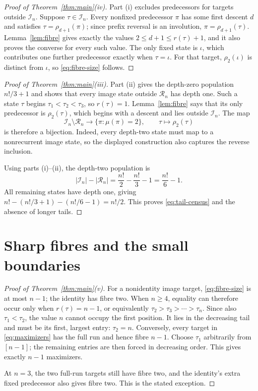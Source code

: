 \documentclass[a4paper,10pt]{amsart}
\theoremstyle{remark}
\newcommand{\cI}{\mathcal I}
\newcommand{\cR}{\mathcal R}
\begin{document}
\begin{proof}[Proof of Theorem~\ref{thm:main}(iv)]
Part (i) excludes predecessors for targets outside $\cI_n$.  Suppose
$\tau\in\cI_n$.  Every nonfixed predecessor $\pi$ has some first descent
$d$ and satisfies $\tau=\rho_{d+1}(\pi)$; since prefix reversal is an
involution, $\pi=\rho_{d+1}(\tau)$.  Lemma~\ref{lem:fibre} gives exactly the
values $2\le d+1\le r(\tau)+1$, and it also proves the converse for every
such value.  The only fixed state is $\iota$, which contributes one further
predecessor exactly when $\tau=\iota$.  For that target, $\rho_2(\iota)$ is
distinct from $\iota$, so \eqref{eq:fibre-size} follows.
\end{proof}

\begin{proof}[Proof of Theorem~\ref{thm:main}(iii)]
Part (ii) gives the depth-zero population $n!/3+1$ and shows that every image
state outside $\cR_n$ has depth one.  Such a state $\tau$ begins
$\tau_1<\tau_2<\tau_3$, so $r(\tau)=1$.  Lemma~\ref{lem:fibre} says that its
only predecessor is $\rho_2(\tau)$, which begins with a descent and lies
outside $\cI_n$.  The map
\begin{equation}\label{eq:depth-two-bijection}
 \cI_n\setminus\cR_n\longrightarrow\{\pi:\mu(\pi)=2\},
 \qquad \tau\longmapsto\rho_2(\tau)
\end{equation}
is therefore a bijection.  Indeed, every depth-two state must map to a
nonrecurrent image state, so the displayed construction also captures the
reverse inclusion.

Using parts (i)--(ii), the depth-two population is
\begin{equation}\label{eq:depth-two-count}
 |\cI_n|-|\cR_n|=\frac{n!}{2}-\frac{n!}{3}-1
                 =\frac{n!}{6}-1.
\end{equation}
All remaining states have depth one, giving
$n!-(n!/3+1)-(n!/6-1)=n!/2$.  This proves \eqref{eq:tail-census} and the
absence of longer tails.
\end{proof}

\section{Sharp fibres and the small boundaries}

\begin{proof}[Proof of Theorem~\ref{thm:main}(v)]
For a nonidentity image target, \eqref{eq:fibre-size} is at most $n-1$;
the identity has fibre two.  When $n\ge4$, equality can therefore occur only
when $r(\tau)=n-1$, or equivalently
$\tau_2>\tau_3>\cdots>\tau_n$.  Since also $\tau_1<\tau_2$, the value $n$
cannot occupy the first position.  It lies in the decreasing tail and must
be its first, largest entry: $\tau_2=n$.  Conversely, every target in
\eqref{eq:maximizers} has the full run and hence fibre $n-1$.  Choose
$\tau_1$ arbitrarily from $[n-1]$; the remaining entries are then forced in
decreasing order.  This gives exactly $n-1$ maximizers.

At $n=3$, the two full-run targets still have fibre two, and the identity's
extra fixed predecessor also gives fibre two.  This is the stated exception.
\end{proof}
\end{document}
